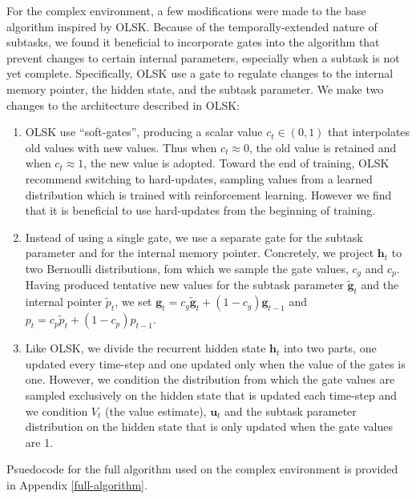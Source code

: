 \documentclass{article}
\begin{document}
For the complex environment, a few modifications were made to the base algorithm
inspired by OLSK. Because of the temporally-extended nature of subtasks, we
found it beneficial to incorporate gates into the algorithm that prevent changes
to certain internal parameters, especially when a subtask is not yet complete.
Specifically, OLSK use a gate to regulate changes to the internal memory
pointer, the hidden state, and the subtask parameter.
We make two changes to the architecture described in OLSK:
\begin{enumerate}
  \item OLSK use ``soft-gates'', producing a scalar value $c_t \in (0, 1)$ that
    interpolates old values with new values. Thus when $c_t \approx 0$, the old
    value is retained and when $c_t \approx 1$, the new value is adopted. Toward
    the end of training, 
    OLSK recommend switching to hard-updates, sampling values from a learned
    distribution which is trained with reinforcement learning. However we find
    that it is beneficial to use hard-updates from the beginning of training.
  \item Instead of using a single gate, we use a separate gate for the
    subtask parameter and for the internal memory pointer.
Concretely, we project $\mathbf{h}_t$ to two Bernoulli distributions, fom which
we sample the gate values, $c_g$ and $c_p$. Having produced tentative new values
for the subtask parameter $\tilde{\mathbf{g}}_t$ and the internal pointer
$\tilde{p}_t$, we set $\mathbf{g}_t = c_g\tilde{\mathbf{g}}_t + (1 -
c_g)\mathbf{g}_{t-1}$ and  $p_t = c_p\tilde{p}_t + (1 - c_p)p_{t-1}$.

  \item Like OLSK, we divide the recurrent hidden state $\mathbf{h}_t$ into two
    parts, one updated every time-step and one updated only when the value of
    the gates is one. However, we condition the distribution from which the gate
    values are sampled exclusively on the hidden state that is updated each
    time-step and we condition $V_t$ (the value estimate), $\mathbf{u}_t$ and
    the subtask parameter distribution on the hidden state that is only updated
    when the gate values are 1.
\end{enumerate}

Psuedocode for the full algorithm used on the complex environment is provided in
Appendix \ref{full-algorithm}.
\end{document}
